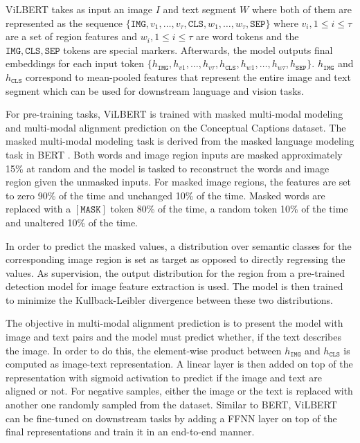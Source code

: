 \documentclass{article}
\begin{document}
ViLBERT takes as input an image $I$ and text segment $W$ where both of them are represented as the sequence $\{\mathtt{IMG}, v_{1}, \dots, v_{\tau}, \mathtt{CLS}, w_{1}, \dots, w_{\tau}, \mathtt{SEP}\}$ where $v_{i}, 1 \leq i \leq \tau$ are a set of region features and $w_{i}, 1 \leq i \leq \tau$ are word tokens and the $\mathtt{IMG, CLS, SEP}$ tokens are special markers. Afterwards, the model outputs final embeddings for each input token $\{h_{\mathtt{IMG}}, h_{v1}, \dots, h_{v \tau}, h_{\mathtt{CLS}}, h_{w1}, \dots, h_{w \tau}, h_{\mathtt{SEP}}\}$. $h_{\mathtt{IMG}}$ and $h_{\mathtt{CLS}}$ correspond to mean-pooled features that represent the entire image and text segment which can be used for downstream language and vision tasks.

For pre-training tasks, ViLBERT is trained with masked multi-modal modeling and multi-modal alignment prediction on the Conceptual Captions \citep{sharma-etal-2018-conceptual} dataset. The masked multi-modal modeling task is derived from the masked language modeling task in BERT \citep{devlin-etal-2019-bert}. Both words and image region inputs are masked approximately 15\% at random and the model is tasked to reconstruct the words and image region given the unmasked inputs. For masked image regions, the features are set to zero 90\% of the time and unchanged 10\% of the time. Masked words are replaced with a $[\mathtt{MASK}]$ token 80\% of the time, a random token 10\% of the time and unaltered 10\% of the time. 

In order to predict the masked values, a distribution over semantic classes for the corresponding image region is set as target as opposed to directly regressing the values. As supervision, the output distribution for the region from a pre-trained detection model for image feature extraction is used. The model is then trained to minimize the Kullback-Leibler divergence between these two distributions.

The objective in multi-modal alignment prediction is to present the model with image and text pairs and the model must predict whether, if the text describes the image. In order to do this, the element-wise product between $h_{\mathtt{IMG}}$ and $h_{\mathtt{CLS}}$ is computed as image-text representation. A linear layer is then added on top of the representation with sigmoid activation to predict if the image and text are aligned or not. For negative samples, either the image or the text is replaced with another one randomly sampled from the dataset. Similar to BERT, ViLBERT can be fine-tuned on downstream tasks by adding a FFNN layer on top of the final representations and train it in an end-to-end manner.
\end{document}
